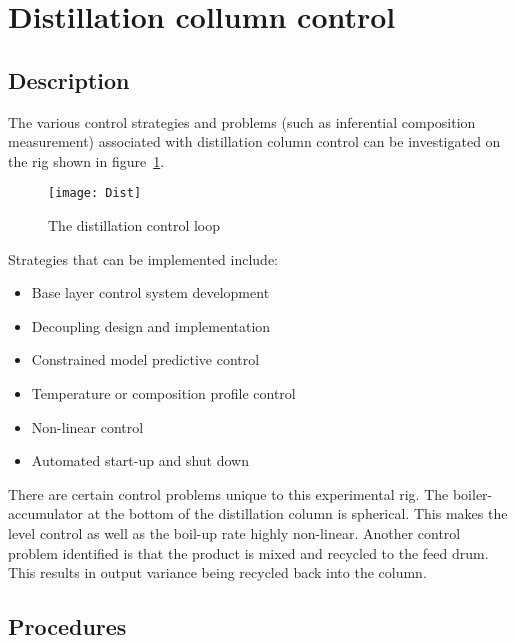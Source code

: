\section{Distillation collumn control}
\subsection{Description}
The various control strategies and problems (such as inferential composition measurement) associated with distillation column control can be investigated on the rig shown in figure~\ref{fig:rig:dist}. \begin{figure}
	\centering
	\texttt{[image: Dist]}
	\caption{The distillation control loop}
	\label{fig:rig:dist}
\end{figure}
Strategies that can be implemented include:
\begin{itemize}
	\item Base layer control system development
	\item Decoupling design and implementation
	\item Constrained model predictive control
	\item Temperature or composition profile control
	\item Non-linear control
	\item Automated start-up and shut down 
\end{itemize}

There are certain control problems unique to this experimental rig. The boiler-accumulator at the bottom of the distillation column is spherical. This makes the level control as well as the boil-up rate highly non-linear. Another control problem identified is that the product is mixed and recycled to the feed drum. This results in output variance being recycled back into the column.

\subsection{Procedures}
